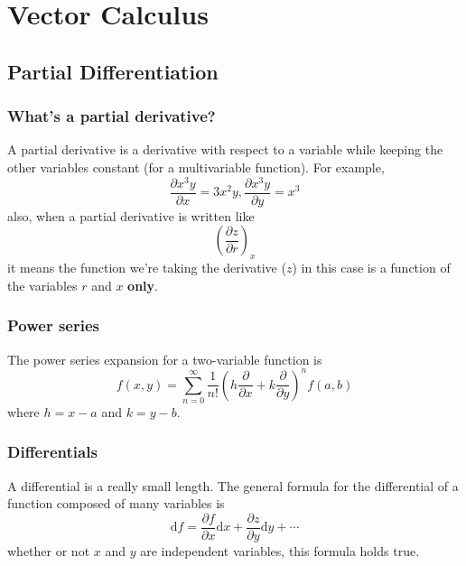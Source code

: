 \documentclass[oneside]{book}
\numberwithin{equation}{chapter} %
\begin{document}
\part{Vector Calculus}
\chapter{Partial Differentiation}
\section{What's a partial derivative?}
A partial derivative is a derivative with respect to a variable while keeping the other variables constant  (for a multivariable function). For example,
$$\frac{\partial x^3y}{\partial x}=3x^2y, \frac{\partial x^3y}{\partial y}=x^3$$
also, when a partial derivative is written like 
$$\left(\frac{\partial z}{\partial r}\right)_x$$
it means the function we're taking the derivative ($z$) in this case is a function of the variables $r$ and $x$ \textbf{only}. 
\section{Power series}
The power series expansion for a two-variable function is 
\begin{equation}
	f(x,y)=\sum^\infty_{n=0}\frac{1}{n!}\left(h\frac{\partial}{\partial x}+k\frac{\partial}{\partial y}\right)^nf(a,b)
\end{equation}
where $h=x-a$ and $k=y-b$.
\section{Differentials}
A differential is a really small length. The general formula for the differential of a function composed of many variables is 
\begin{equation}
\mathrm df=\frac{\partial f}{\partial x}\mathrm dx+\frac{\partial z}{\partial y}\mathrm dy+\cdots
\end{equation}
whether or not $x$ and $y$ are independent variables, this formula holds true. 
\end{document}
